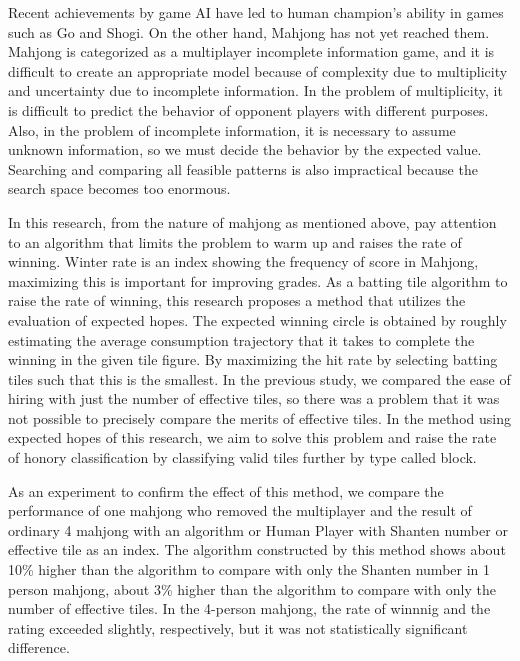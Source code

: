 \begin{eabstract}


Recent achievements by game AI have led to human champion's ability in games such as Go and Shogi. On the other hand, Mahjong has not yet reached them. Mahjong is categorized as a multiplayer incomplete information game, and it is difficult to create an appropriate model because of complexity due to multiplicity and uncertainty due to incomplete information. In the problem of multiplicity, it is difficult to predict the behavior of opponent players with different purposes. Also, in the problem of incomplete information, it is necessary to assume unknown information, so we must decide the behavior by the expected value. Searching and comparing all feasible patterns is also impractical because the search space becomes too enormous.

In this research, from the nature of mahjong as mentioned above, pay attention to an algorithm that limits the problem to warm up and raises the rate of winning. Winter rate is an index showing the frequency of score in Mahjong, maximizing this is important for improving grades. As a batting tile algorithm to raise the rate of winning, this research proposes a method that utilizes the evaluation of expected hopes. The expected winning circle is obtained by roughly estimating the average consumption trajectory that it takes to complete the winning in the given tile figure. By maximizing the hit rate by selecting batting tiles such that this is the smallest. In the previous study, we compared the ease of hiring with just the number of effective tiles, so there was a problem that it was not possible to precisely compare the merits of effective tiles. In the method using expected hopes of this research, we aim to solve this problem and raise the rate of honory classification by classifying valid tiles further by type called block.


As an experiment to confirm the effect of this method, we compare the performance of one mahjong who removed the multiplayer and the result of ordinary 4 mahjong with an algorithm or Human Player with Shanten number or effective tile as an index. The algorithm constructed by this method shows about 10\% higher than the algorithm to compare with only the Shanten number in 1 person mahjong, about 3\% higher than the algorithm to compare with only the number of effective tiles. In the 4-person mahjong, the rate of winnnig and the rating exceeded slightly, respectively, but it was not statistically significant difference.


\end{eabstract}
